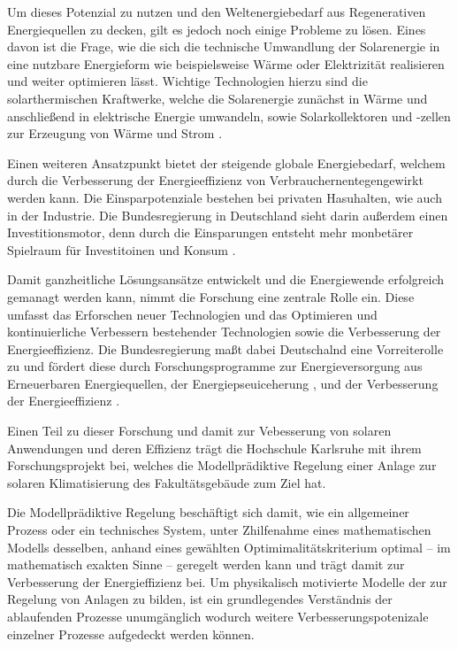 Um dieses Potenzial zu nutzen und den Weltenergiebedarf aus Regenerativen Energiequellen zu decken, gilt es jedoch noch einige Probleme zu lösen. Eines davon ist die Frage, wie die sich die technische Umwandlung der Solarenergie in eine nutzbare Energieform wie beispielsweise Wärme oder Elektrizität realisieren und weiter optimieren lässt. Wichtige Technologien hierzu sind die solarthermischen Kraftwerke, welche die Solarenergie zunächst in Wärme und anschließend in elektrische Energie umwandeln, sowie Solarkollektoren und -zellen zur Erzeugung von Wärme und Strom \cite[S.~34ff.]{qu11}.

Einen weiteren Ansatzpunkt bietet der steigende globale Energiebedarf, welchem durch die Verbesserung der Energieeffizienz von Verbrauchernentegengewirkt werden kann. Die Einsparpotenziale bestehen bei privaten Hasuhalten, wie auch in der Industrie. Die Bundesregierung in Deutschland sieht darin außerdem einen Investitionsmotor, denn durch die Einsparungen entsteht mehr monbetärer Spielraum für Investitoinen und Konsum \cite[S.~2]{bi15}.


Damit ganzheitliche Lösungsansätze entwickelt und die Energiewende erfolgreich gemanagt werden kann, nimmt die Forschung eine zentrale Rolle ein. Diese umfasst das Erforschen neuer Technologien und das Optimieren und kontinuierliche Verbessern bestehender Technologien sowie die Verbesserung der Energieeffizienz. Die Bundesregierung maßt dabei Deutschalnd eine Vorreiterolle zu und fördert diese durch Forschungsprogramme zur Energieversorgung aus Erneuerbaren Energiequellen, der Energiepseuiceherung , und der Verbesserung der Energieeffizienz \cite[S.~11]{bi15}.

 
Einen Teil zu dieser Forschung und damit zur Vebesserung von solaren Anwendungen und deren Effizienz trägt die Hochschule Karlsruhe mit ihrem Forschungsprojekt bei, welches die Modellprädiktive Regelung einer Anlage zur solaren Klimatisierung des Fakultätsgebäude zum Ziel hat.

Die Modellprädiktive Regelung beschäftigt sich damit, wie ein allgemeiner Prozess oder ein technisches System, unter Zhilfenahme eines mathematischen Modells desselben, anhand eines gewählten Optimimalitätskriterium optimal -- im mathematisch exakten Sinne -- geregelt werden kann und trägt damit zur Verbesserung der Energieffizienz bei. Um  physikalisch motivierte Modelle der zur Regelung von Anlagen zu bilden, ist ein grundlegendes Verständnis der ablaufenden Prozesse unumgänglich wodurch weitere Verbesserungspotenizale einzelner Prozesse aufgedeckt werden können.

